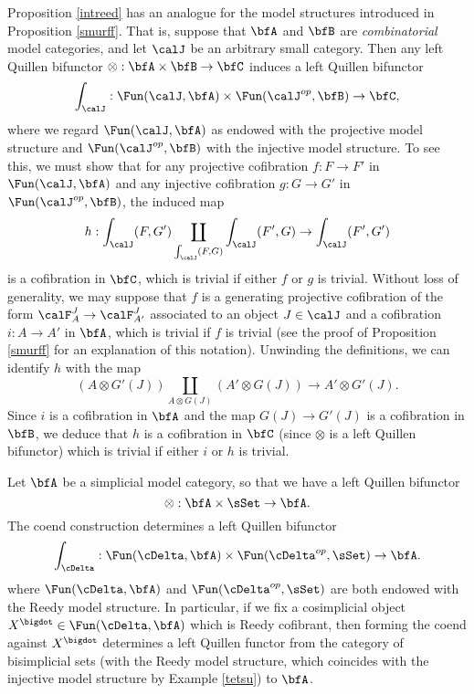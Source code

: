 \begin{Model Categories}
\begin{Didn't Read}
\begin{remark}\label{cabler}
Proposition \ref{intreed} has an analogue for the model structures introduced in Proposition \ref{smurff}. That is, suppose that $\bfA$ and $\bfB$ are {\em combinatorial} model categories, and let $\calJ$ be an arbitrary small category. Then any left Quillen bifunctor
$\otimes: \bfA \times \bfB \rightarrow \bfC$ induces a left Quillen bifunctor
$$ \int_{ \calJ}: \Fun( \calJ, \bfA) \times \Fun( \calJ^{op}, \bfB) \rightarrow \bfC,$$
where we regard $\Fun(\calJ, \bfA)$ as endowed with the projective model structure
and $\Fun(\calJ^{op}, \bfB)$ with the injective model structure. To see this, we must show that 
for any projective cofibration $f: F \rightarrow F'$ in $\Fun(\calJ, \bfA)$ and any injective cofibration
$g: G \rightarrow G'$ in $\Fun(\calJ^{op}, \bfB)$, the induced map 
$$ h: \int_{\calJ}(F,G') \coprod_{ \int_{\calJ}(F,G) } \int_{\calJ}(F',G) \rightarrow \int_{\calJ}(F',G')$$
is a cofibration in $\bfC$, which is trivial if either $f$ or $g$ is trivial. Without loss of generality,
we may suppose that $f$ is a generating projective cofibration of the form
$\calF^{J}_{A} \rightarrow \calF^{J}_{A'}$ associated to an object $J \in \calJ$ and a
cofibration $i: A \rightarrow A'$ in $\bfA$, which is trivial if $f$ is trivial (see
the proof of Proposition \ref{smurff} for an explanation of this notation). Unwinding the definitions, we can identify $h$ with the map
$$ (A \otimes G'(J)) \coprod_{ A \otimes G(J) } (A' \otimes G(J)) \rightarrow
A' \otimes G'(J).$$
Since $i$ is a cofibration in $\bfA$ and the map $G(J) \rightarrow G'(J)$
is a cofibration in $\bfB$, we deduce that $h$ is a cofibration
in $\bfC$ (since $\otimes$ is a left Quillen bifunctor) which is trivial if either
$i$ or $h$ is trivial.
\end{remark}

\begin{example}\label{cabletome}
Let $\bfA$ be a simplicial model category, so that we have a left Quillen bifunctor
$$ \otimes: \bfA \times \sSet \rightarrow \bfA.$$
The coend construction determines a left Quillen bifunctor
$$ \int_{\cDelta}: \Fun( \cDelta, \bfA) \times \Fun( \cDelta^{op}, \sSet) \rightarrow \bfA.$$
where $\Fun(\cDelta, \bfA)$ and $\Fun( \cDelta^{op}, \sSet)$ are both endowed with the Reedy model structure. In particular, if we fix a cosimplicial object
$X^{\bigdot} \in \Fun(\cDelta, \bfA)$ which is Reedy cofibrant, then forming the coend
against $X^{\bigdot}$ determines a left Quillen functor from the category
of bisimplicial sets (with the Reedy model structure, which coincides with the
injective model structure by Example \ref{tetsu}) to $\bfA$.
\end{example}


\end{Didn't Read}
\end{Model Categories}
